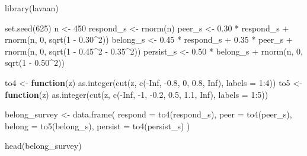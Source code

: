 \documentclass[
  letterpaper,
  DIV=11,
  numbers=noendperiod]{scrartcl}
\newenvironment{Shaded}{\begin{snugshade}}{\end{snugshade}}
\newcommand{\AttributeTok}[1]{\textcolor[rgb]{0.40,0.45,0.13}{#1}}
\newcommand{\ConstantTok}[1]{\textcolor[rgb]{0.56,0.35,0.01}{#1}}
\newcommand{\ControlFlowTok}[1]{\textcolor[rgb]{0.00,0.23,0.31}{\textbf{#1}}}
\newcommand{\DecValTok}[1]{\textcolor[rgb]{0.68,0.00,0.00}{#1}}
\newcommand{\FloatTok}[1]{\textcolor[rgb]{0.68,0.00,0.00}{#1}}
\newcommand{\FunctionTok}[1]{\textcolor[rgb]{0.28,0.35,0.67}{#1}}
\newcommand{\NormalTok}[1]{\textcolor[rgb]{0.00,0.23,0.31}{#1}}
\newcommand{\OtherTok}[1]{\textcolor[rgb]{0.00,0.23,0.31}{#1}}
\newcommand{\SpecialCharTok}[1]{\textcolor[rgb]{0.37,0.37,0.37}{#1}}
\begin{document}
\begin{Shaded}
\begin{Highlighting}[]
\FunctionTok{library}\NormalTok{(lavaan)}

\FunctionTok{set.seed}\NormalTok{(}\DecValTok{625}\NormalTok{)}
\NormalTok{n }\OtherTok{\textless{}{-}} \DecValTok{450}
\NormalTok{respond\_s }\OtherTok{\textless{}{-}} \FunctionTok{rnorm}\NormalTok{(n)}
\NormalTok{peer\_s    }\OtherTok{\textless{}{-}} \FloatTok{0.30} \SpecialCharTok{*}\NormalTok{ respond\_s }\SpecialCharTok{+} \FunctionTok{rnorm}\NormalTok{(n, }\DecValTok{0}\NormalTok{, }\FunctionTok{sqrt}\NormalTok{(}\DecValTok{1} \SpecialCharTok{{-}} \FloatTok{0.30}\SpecialCharTok{\^{}}\DecValTok{2}\NormalTok{))}
\NormalTok{belong\_s  }\OtherTok{\textless{}{-}} \FloatTok{0.45} \SpecialCharTok{*}\NormalTok{ respond\_s }\SpecialCharTok{+} \FloatTok{0.35} \SpecialCharTok{*}\NormalTok{ peer\_s }\SpecialCharTok{+}
             \FunctionTok{rnorm}\NormalTok{(n, }\DecValTok{0}\NormalTok{, }\FunctionTok{sqrt}\NormalTok{(}\DecValTok{1} \SpecialCharTok{{-}} \FloatTok{0.45}\SpecialCharTok{\^{}}\DecValTok{2} \SpecialCharTok{{-}} \FloatTok{0.35}\SpecialCharTok{\^{}}\DecValTok{2}\NormalTok{))}
\NormalTok{persist\_s }\OtherTok{\textless{}{-}} \FloatTok{0.50} \SpecialCharTok{*}\NormalTok{ belong\_s }\SpecialCharTok{+} \FunctionTok{rnorm}\NormalTok{(n, }\DecValTok{0}\NormalTok{, }\FunctionTok{sqrt}\NormalTok{(}\DecValTok{1} \SpecialCharTok{{-}} \FloatTok{0.50}\SpecialCharTok{\^{}}\DecValTok{2}\NormalTok{))}

\NormalTok{to4 }\OtherTok{\textless{}{-}} \ControlFlowTok{function}\NormalTok{(z) }\FunctionTok{as.integer}\NormalTok{(}\FunctionTok{cut}\NormalTok{(z, }\FunctionTok{c}\NormalTok{(}\SpecialCharTok{{-}}\ConstantTok{Inf}\NormalTok{, }\SpecialCharTok{{-}}\FloatTok{0.8}\NormalTok{, }\DecValTok{0}\NormalTok{, }\FloatTok{0.8}\NormalTok{, }\ConstantTok{Inf}\NormalTok{), }\AttributeTok{labels =} \DecValTok{1}\SpecialCharTok{:}\DecValTok{4}\NormalTok{))}
\NormalTok{to5 }\OtherTok{\textless{}{-}} \ControlFlowTok{function}\NormalTok{(z) }\FunctionTok{as.integer}\NormalTok{(}\FunctionTok{cut}\NormalTok{(z, }\FunctionTok{c}\NormalTok{(}\SpecialCharTok{{-}}\ConstantTok{Inf}\NormalTok{, }\SpecialCharTok{{-}}\DecValTok{1}\NormalTok{, }\SpecialCharTok{{-}}\FloatTok{0.2}\NormalTok{, }\FloatTok{0.5}\NormalTok{, }\FloatTok{1.1}\NormalTok{, }\ConstantTok{Inf}\NormalTok{), }\AttributeTok{labels =} \DecValTok{1}\SpecialCharTok{:}\DecValTok{5}\NormalTok{))}

\NormalTok{belong\_survey }\OtherTok{\textless{}{-}} \FunctionTok{data.frame}\NormalTok{(}
  \AttributeTok{respond =} \FunctionTok{to4}\NormalTok{(respond\_s),}
  \AttributeTok{peer    =} \FunctionTok{to4}\NormalTok{(peer\_s),}
  \AttributeTok{belong  =} \FunctionTok{to5}\NormalTok{(belong\_s),}
  \AttributeTok{persist =} \FunctionTok{to4}\NormalTok{(persist\_s)}
\NormalTok{)}

\FunctionTok{head}\NormalTok{(belong\_survey)}
\end{Highlighting}
\end{Shaded}
\end{document}
